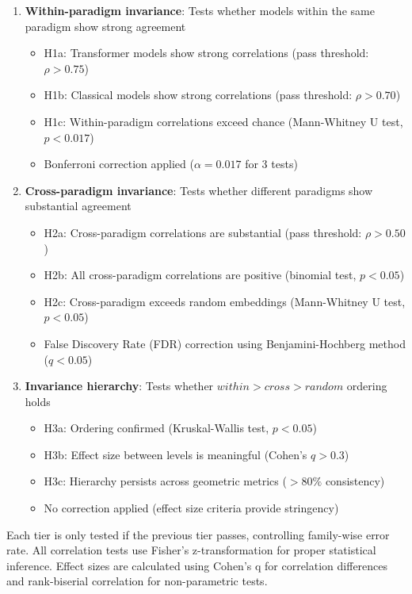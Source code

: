 \documentclass[11pt,letterpaper]{article}
\begin{document}
\begin{enumerate}
\item \textbf{Within-paradigm invariance}: Tests whether models within the same paradigm show strong agreement
   \begin{itemize}
   \item H1a: Transformer models show strong correlations (pass threshold: $\rho > 0.75$)
   \item H1b: Classical models show strong correlations (pass threshold: $\rho > 0.70$)
   \item H1c: Within-paradigm correlations exceed chance (Mann-Whitney U test, $p < 0.017$)
   \item Bonferroni correction applied ($\alpha = 0.017$ for 3 tests)
   \end{itemize}

\item \textbf{Cross-paradigm invariance}: Tests whether different paradigms show substantial agreement
   \begin{itemize}
   \item H2a: Cross-paradigm correlations are substantial (pass threshold: $\rho > 0.50$)
   \item H2b: All cross-paradigm correlations are positive (binomial test, $p < 0.05$)
   \item H2c: Cross-paradigm exceeds random embeddings (Mann-Whitney U test, $p < 0.05$)
   \item False Discovery Rate (FDR) correction using Benjamini-Hochberg method ($q < 0.05$)
   \end{itemize}

\item \textbf{Invariance hierarchy}: Tests whether $within > cross > random$ ordering holds
   \begin{itemize}
   \item H3a: Ordering confirmed (Kruskal-Wallis test, $p < 0.05$)
   \item H3b: Effect size between levels is meaningful (Cohen's $q > 0.3$)
   \item H3c: Hierarchy persists across geometric metrics ($> 80\%$ consistency)
   \item No correction applied (effect size criteria provide stringency)
   \end{itemize}
\end{enumerate}

Each tier is only tested if the previous tier passes, controlling family-wise error rate. All correlation tests use Fisher's z-transformation for proper statistical inference. Effect sizes are calculated using Cohen's q for correlation differences and rank-biserial correlation for non-parametric tests.
\end{document}
